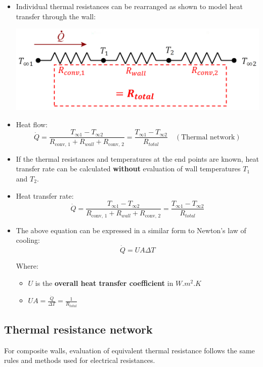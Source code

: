 \documentclass[11pt]{article}
\begin{document}
 \newpage

\begin{itemize}
\item Individual thermal resistances can be rearranged as shown to model heat transfer through the wall:
\begin{center}
\includegraphics[width=.9\linewidth]{./images/analysis-of-steady-state-heat-transfer-electrical-analogy.png}
\end{center}
\item Heat flow:
\[\dot{Q} = \frac{T_{\infty 1} - T_{\infty 2}}{R_{\text{conv, 1}} + R_{wall} + R_{\text{conv, 2}}} = \frac{T_{\infty 1} - T_{\infty 2}}{R_{total}} \quad (\text{Thermal network})\]
\item If the thermal resistances and temperatures at the end points are known, heat transfer rate can be calculated \textbf{without} evaluation of wall temperatures \(T_1\) and \(T_2\).
\item Heat transfer rate:
\[\dot{Q} = \frac{T_{\infty 1} - T_{\infty 2}}{R_{\text{conv, 1}} + R_{wall} + R_{\text{conv, 2}}} = \frac{T_{\infty 1} - T_{\infty 2}}{R_{total}}\]
\item The above equation can be expressed in a similar form to Newton's law of cooling:
\[\dot{Q} = UA \Delta T\]

Where:
\begin{itemize}
\item \(U\) is the \textbf{overall heat transfer coefficient} in \(\unit{W.m^{2}.K}\)
\item \(UA = \frac{\dot{Q}}{\Delta T} = \frac{1}{R_{total}}\)
\end{itemize}
\end{itemize}

 \newpage
\subsection{Thermal resistance network}
\label{sec:orgba9b841}
For composite walls, evaluation of equivalent thermal resistance follows the same rules and methods used for electrical resistances.
\end{document}
